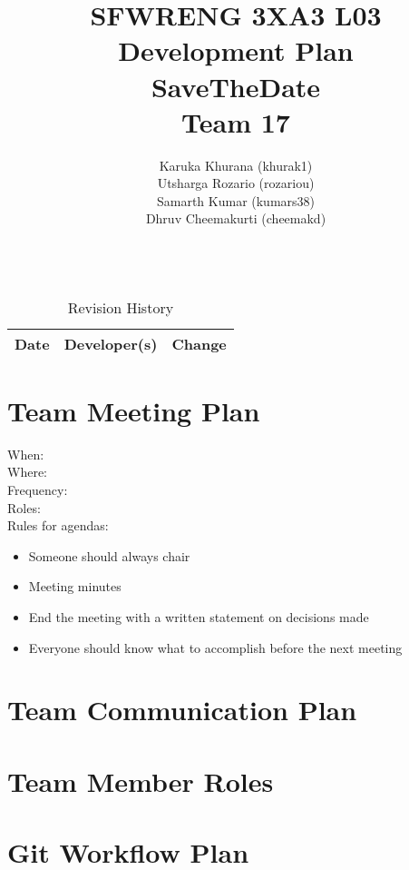\documentclass[12pt, titlepage]{article}
\title{SFWRENG 3XA3 L03 \\ Development Plan
        \\[1ex] \large SaveTheDate\\ Team 17}
\author{
        Karuka Khurana (khurak1)\\
        Utsharga Rozario (rozariou)\\
        Samarth Kumar (kumars38)\\
        Dhruv Cheemakurti (cheemakd)\\
        \\
}
\begin{document}
\maketitle

\tableofcontents
\listoftables
\listoffigures

\begin{table}[!hbp]
    \caption{Revision History} \label{RevisionHistory}
    \begin{tabularx}{\textwidth}{llX}
        \toprule
            \textbf{Date} & \textbf{Developer(s)} & \textbf{Change}\\
        \midrule

        \bottomrule
    \end{tabularx}
\end{table}

\newpage

\maketitle

\newpage
\section{Team Meeting Plan}
When: \\
Where: \\
Frequency: \\
Roles: \\
Rules for agendas:
\begin{itemize}
    \item Someone should always chair
    \item Meeting minutes
    \item End the meeting with a written statement on decisions made
    \item Everyone should know what to accomplish before the next meeting
\end{itemize}

\section{Team Communication Plan}

\section{Team Member Roles}

\section{Git Workflow Plan}
\end{document}
